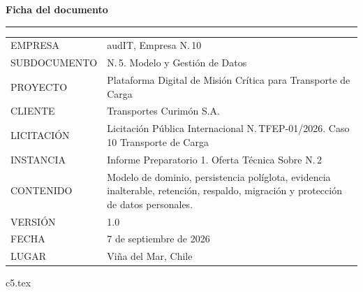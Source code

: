 \documentclass[12pt, letterpaper, table, xcdraw]{inf-pucv}
\begin{document}

\thispagestyle{folioficha}
\vspace*{1.2cm}
{\color{audITnavy}\fontsize{28}{32}\selectfont\bfseries Ficha del documento}

\vspace{10pt}
{\color{audITteal}\rule{\linewidth}{2pt}}

\vspace{22pt}
{\small
\begin{longtable}{@{}p{3.5cm}p{10.5cm}@{}}
\color{audITgris}EMPRESA & \color{black}audIT, Empresa N.\textordmasculine{}\,10 \\
\color{audITgris}SUBDOCUMENTO & \color{black}N.\textordmasculine{}\,5. Modelo y Gestión de Datos \\
\color{audITgris}PROYECTO & \color{black}Plataforma Digital de Misión Crítica para Transporte de Carga \\
\color{audITgris}CLIENTE & \color{black}Transportes Curimón S.A. \\
\color{audITgris}LICITACIÓN & \color{black}Licitación Pública Internacional N.\textordmasculine{}\,TFEP-01/2026. Caso 10 Transporte de Carga \\
\color{audITgris}INSTANCIA & \color{black}Informe Preparatorio 1. Oferta Técnica Sobre N.\textordmasculine{}\,2 \\
\color{audITgris}CONTENIDO & \color{black}Modelo de dominio, persistencia políglota, evidencia inalterable, retención, respaldo, migración y protección de datos personales. \\
\color{audITgris}VERSIÓN & \color{black}1.0 \\
\color{audITgris}FECHA & \color{black}7 de septiembre de 2026 \\
\color{audITgris}LUGAR & \color{black}Viña del Mar, Chile \\
\end{longtable}}
\clearpage

\renewcommand{\contentsname}{Índice}
\tableofcontents
\clearpage

{c5.tex}

\clearpage
{}
{}
\printbibliography[title={Bibliografía}]
\end{document}
